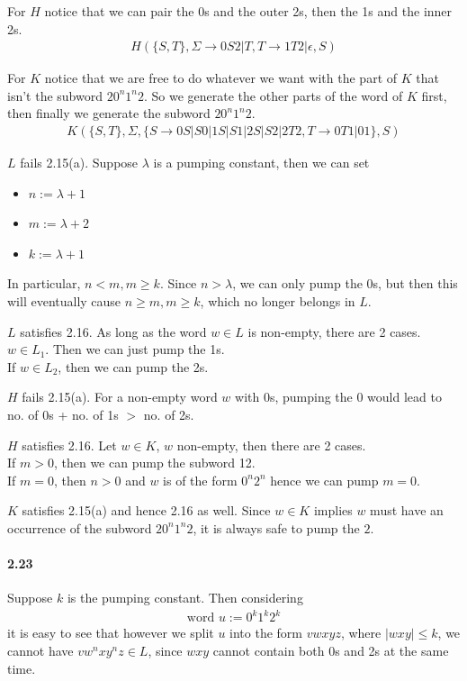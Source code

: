 \documentclass{article}
\begin{document}
For $H$ notice that we can pair the 0s and the outer 2s, then the 1s and the inner 2s.
\begin{align*}
	H (\{S,T\}, \Sigma \rightarrow 0S2|T, T \rightarrow 1T2|\epsilon, S)
\end{align*}

For $K$ notice that we are free to do whatever we want with the part of $K$ that isn't the subword $20^n1^n2$. So we generate the other parts of the word of $K$ first, then finally we generate the subword $20^n1^n2$.
\begin{align*}
	K (\{S,T\}, \Sigma, \{S\rightarrow 0S|S0|1S|S1|2S|S2|2T2, T\rightarrow 0T1|01\},S)
\end{align*}

$L$ fails 2.15(a). Suppose $\lambda$ is a pumping constant, then we can set
\begin{itemize}
	\item $n:=\lambda + 1$
	\item $m:=\lambda + 2$
	\item $k:=\lambda + 1$
\end{itemize}
In particular, $n < m, m\geq k$. Since $n>\lambda$, we can only pump the 0s, but then this will eventually cause $n \geq m, m \geq k$, which no longer belongs in $L$.

$L$ satisfies 2.16. As long as the word $w\in L$ is non-empty, there are 2 cases.\\
$w\in L_1$. Then we can just pump the 1s.\\
If $w\in L_2$, then we can pump the 2s.

$H$ fails 2.15(a). For a non-empty word $w$ with 0s, pumping the 0 would lead to no. of 0s + no. of 1s $>$ no. of 2s.

$H$ satisfies 2.16. Let $w\in K$, $w$ non-empty, then there are 2 cases.\\
If $m>0$, then we can pump the subword 12.\\
If $m=0$, then $n>0$ and $w$ is of the form $0^n2^n$ hence we can pump $m=0$.

$K$ satisfies 2.15(a) and hence 2.16 as well. Since $w\in K$ implies $w$ must have an occurrence of the subword $20^n1^n2$, it is always safe to pump the $2$.


\paragraph{2.23}\mbox{}

Suppose $k$ is the pumping constant. Then considering 
\begin{align*}
	\text{word } u:=0^k1^k2^k
\end{align*}
it is easy to see that however we split $u$ into the form $vwxyz$, where $|wxy|\leq k$, we cannot have $vw^nxy^nz\in L$, since $wxy$ cannot contain both 0s and 2s at the same time.
\end{document}
